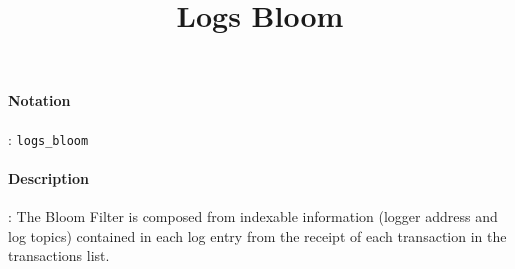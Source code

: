 \documentclass[10pt,a4paper,oneside]{scrartcl}
\author{}
\title{Logs Bloom}
\date{}
\begin{document}
\maketitle
\paragraph{Notation}: \texttt{logs\_bloom}
\paragraph{Description}: The Bloom Filter is composed from indexable information (logger address and log topics) contained in each log entry from the receipt of each transaction in the transactions list. 
\end{document}
